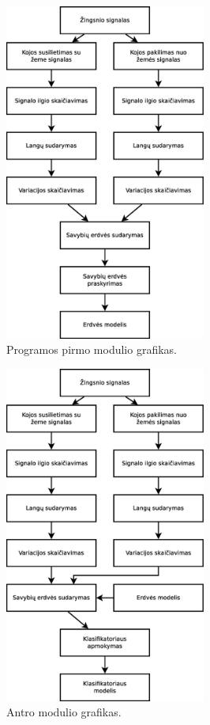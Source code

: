 \documentclass[]{vgtuef}
\begin{document}
\begin{figure}[!t]
  \centering
  \includegraphics[width=250px]{figures/pirma_faze.eps}
  \caption{Programos pirmo modulio grafikas.}
  \label{fig:pirma_faze}
\end{figure}

\begin{figure}[!t]
  \centering
  \includegraphics[width=250px]{figures/antra_faze.eps}
  \caption{Antro modulio grafikas.}
  \label{fig:antra_faze}
\end{figure}
\end{document}
